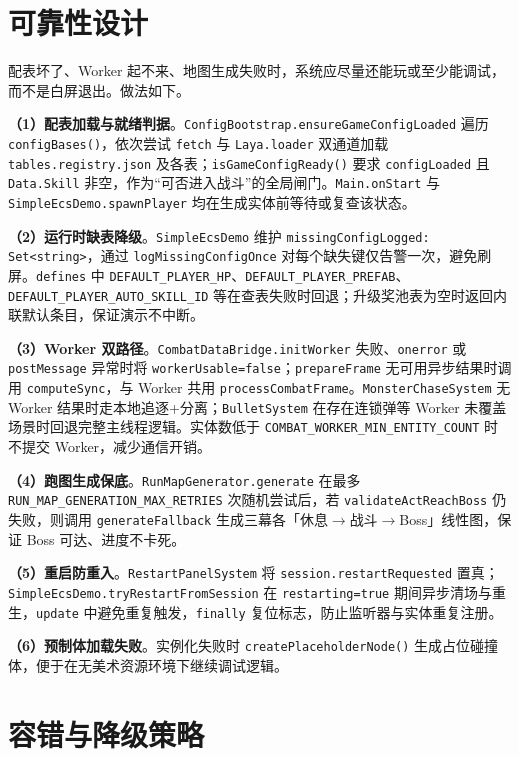 \section{可靠性设计}
\label{sec:reliability}

配表坏了、Worker 起不来、地图生成失败时，系统应尽量还能玩或至少能调试，而不是白屏退出。做法如下。

\textbf{（1）配表加载与就绪判据}。\texttt{ConfigBootstrap.ensureGameConfigLoaded} 遍历 \texttt{configBases()}，依次尝试 \texttt{fetch} 与 \texttt{Laya.loader} 双通道加载 \texttt{tables.registry.json} 及各表；\texttt{isGameConfigReady()} 要求 \texttt{configLoaded} 且 \texttt{Data.Skill} 非空，作为“可否进入战斗”的全局闸门。\texttt{Main.onStart} 与 \texttt{SimpleEcsDemo.spawnPlayer} 均在生成实体前等待或复查该状态。

\textbf{（2）运行时缺表降级}。\texttt{SimpleEcsDemo} 维护 \texttt{missingConfigLogged: Set<string>}，通过 \texttt{logMissingConfigOnce} 对每个缺失键仅告警一次，避免刷屏。\texttt{defines} 中 \texttt{DEFAULT\_PLAYER\_HP}、\texttt{DEFAULT\_PLAYER\_PREFAB}、\texttt{DEFAULT\_PLAYER\_AUTO\_SKILL\_ID} 等在查表失败时回退；升级奖池表为空时返回内联默认条目，保证演示不中断。

\textbf{（3）Worker 双路径}。\texttt{CombatDataBridge.initWorker} 失败、\texttt{onerror} 或 \texttt{postMessage} 异常时将 \texttt{workerUsable=false}；\texttt{prepareFrame} 无可用异步结果时调用 \texttt{computeSync}，与 Worker 共用 \texttt{processCombatFrame}。\texttt{MonsterChaseSystem} 无 Worker 结果时走本地追逐+分离；\texttt{BulletSystem} 在存在连锁弹等 Worker 未覆盖场景时回退完整主线程逻辑。实体数低于 \texttt{COMBAT\_WORKER\_MIN\_ENTITY\_COUNT} 时不提交 Worker，减少通信开销。

\textbf{（4）跑图生成保底}。\texttt{RunMapGenerator.generate} 在最多 \texttt{RUN\_MAP\_GENERATION\_MAX\_RETRIES} 次随机尝试后，若 \texttt{validateActReachBoss} 仍失败，则调用 \texttt{generateFallback} 生成三幕各「休息$\rightarrow$战斗$\rightarrow$Boss」线性图，保证 Boss 可达、进度不卡死。

\textbf{（5）重启防重入}。\texttt{RestartPanelSystem} 将 \texttt{session.restartRequested} 置真；\texttt{SimpleEcsDemo.tryRestartFromSession} 在 \texttt{restarting=true} 期间异步清场与重生，\texttt{update} 中避免重复触发，\texttt{finally} 复位标志，防止监听器与实体重复注册。

\textbf{（6）预制体加载失败}。实例化失败时 \texttt{createPlaceholderNode()} 生成占位碰撞体，便于在无美术资源环境下继续调试逻辑。

\section{容错与降级策略}
\label{sec:fault-tolerance}

